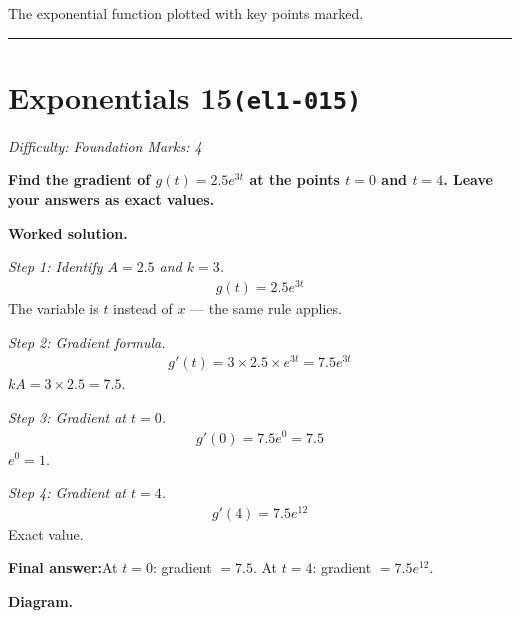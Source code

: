 \documentclass[11pt]{article}
\newcommand{\question}[1]{\par\medskip\noindent\textbf{#1}\par}
\begin{document}
\begin{center}
{
}
\end{center}
\small The exponential function plotted with key points marked.\normalsize

\medskip\hrule

\section*{Exponentials 15\quad\small\texttt{(el1-015)}}
\textit{Difficulty: Foundation \quad\textbar\quad Marks: 4}

\question{Find the gradient of \( g(t) = 2.5e^{3t} \) at the points \( t = 0 \) and \( t = 4 \). Leave your answers as exact values.}

\textbf{Worked solution.}

\textit{Step 1: Identify \( A = 2.5 \) and \( k = 3 \).}
\[\begin{gathered}
g(t) = 2.5e^{3t}
\end{gathered}\]
The variable is \( t \) instead of \( x \) --- the same rule applies.

\textit{Step 2: Gradient formula.}
\[\begin{gathered}
g'(t) = 3 \times 2.5 \times e^{3t} = 7.5e^{3t}
\end{gathered}\]
\( kA = 3 \times 2.5 = 7.5 \).

\textit{Step 3: Gradient at \( t = 0 \).}
\[\begin{gathered}
g'(0) = 7.5e^0 = 7.5
\end{gathered}\]
\( e^0 = 1 \).

\textit{Step 4: Gradient at \( t = 4 \).}
\[\begin{gathered}
g'(4) = 7.5e^{12}
\end{gathered}\]
Exact value.

\begin{answerbox}
\textbf{Final answer:}\quad At \(\displaystyle  t = 0 \): gradient \(\displaystyle  = 7.5 \). At \(\displaystyle  t = 4 \): gradient \(\displaystyle  = 7.5e^{12} \).
\end{answerbox}
\textbf{Diagram.}
\end{document}

